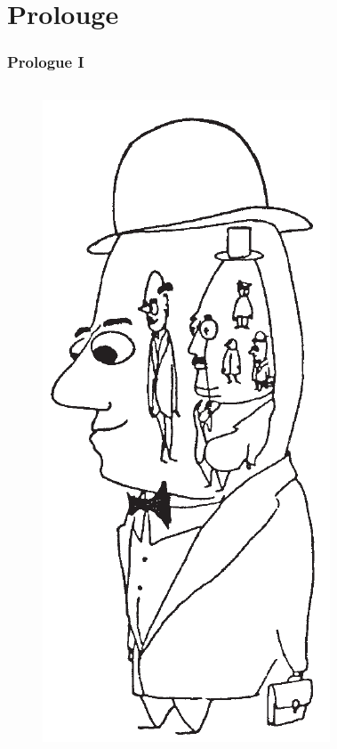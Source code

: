 \documentclass[
	11pt,
	aspectratio=169,
]{beamer}
\begin{document}
\section*{Prolouge}
\begin{frame}
	\frametitle{Prologue I}
	\begin{columns}
			\begin{figure}
				\includegraphics[height=0.7\textheight]{resources/man.png}
			\end{figure}
			\begin{figure}

\end{figure}
\end{columns}
\end{frame}
\end{document}
